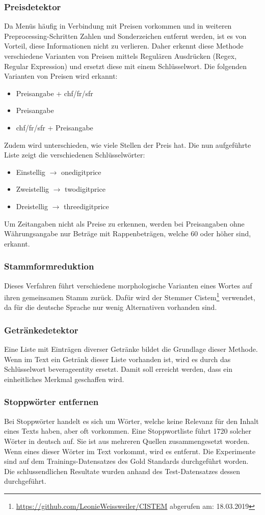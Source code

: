 \subsubsection{Preisdetektor}
Da Menüs häufig in Verbindung mit Preisen vorkommen und in weiteren Preprocessing-Schritten Zahlen und Sonderzeichen entfernt werden, ist es von Vorteil, diese Informationen nicht zu verlieren.
Daher erkennt diese Methode verschiedene Varianten von Preisen mittels Regulären Ausdrücken (Regex, Regular Expression) und ersetzt diese mit einem Schlüsselwort.
Die folgenden Varianten von Preisen wird erkannt:
\begin{itemize}
	\item Preisangabe + chf/fr/sfr
	\item Preisangabe
	\item chf/fr/sfr + Preisangabe
\end{itemize} 
Zudem wird unterschieden, wie viele Stellen der Preis hat.
Die nun aufgeführte Liste zeigt die verschiedenen Schlüsselwörter:
\begin{itemize}
	\item Einstellig $\rightarrow$ onedigitprice
	\item Zweistellig $\rightarrow$ twodigitprice
	\item Dreistellig $\rightarrow$ threedigitprice
\end{itemize} 
Um Zeitangaben nicht als Preise zu erkennen, werden bei Preisangaben ohne Währungsangabe nur Beträge mit Rappenbeträgen, welche 60 oder höher sind, erkannt.
\subsubsection{Stammformreduktion}
Dieses Verfahren führt verschiedene morphologische Varianten eines Wortes auf ihren gemeinsamen Stamm zurück.
Dafür wird der Stemmer \glqq Cistem\footnote{\url{https://github.com/LeonieWeissweiler/CISTEM} abgerufen am: 18.03.2019}\grqq{} verwendet, da für die deutsche Sprache nur wenig Alternativen vorhanden sind. 
\subsubsection{Getränkedetektor}
Eine Liste mit Einträgen diverser Getränke bildet die Grundlage dieser Methode.
Wenn im Text ein Getränk dieser Liste vorhanden ist, wird es durch das Schlüsselwort \glqq beverageentity\grqq{} ersetzt.
Damit soll erreicht werden, dass ein einheitliches Merkmal geschaffen wird.
\subsubsection{Stoppwörter entfernen}
Bei Stoppwörter handelt es sich um Wörter, welche keine Relevanz für den Inhalt eines Texts haben, aber oft vorkommen.
Eine Stoppwortliste führt 1720 solcher Wörter in deutsch auf. Sie ist aus mehreren Quellen zusammengesetzt worden.
Wenn eines dieser Wörter im Text vorkommt, wird es entfernt.
Die Experimente sind auf dem Trainings-Datensatzes des Gold Standards durchgeführt worden.
Die schlussendlichen Resultate wurden anhand des Test-Datensatzes dessen durchgeführt.

